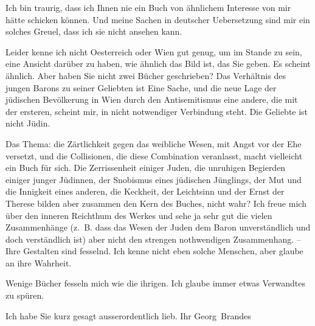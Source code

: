\pstart
           {\pb}Ich bin traurig, dass ich Ihnen
               nie ein Buch von ähnlichem Interesse von mir hätte schicken können. Und meine Sachen
               in deutscher Uebersetzung sind mir ein solches Greuel, dass ich sie nicht ansehen
               kann.\pend
           
\pstart
           Leider kenne ich nicht Oesterreich oder Wien gut genug, um im Stande zu sein, eine Ansicht
               darüber zu haben, wie ähnlich das Bild ist, das Sie geben. Es scheint ähnlich. Aber
               haben Sie nicht zwei Bücher geschrieben? Das Verhältnis des jungen Barons zu seiner Geliebten ist Eine Sache,
               und die {\pb}neue Lage der jüdischen
               Bevölkerung in Wien durch den Antisemitismus eine
               andere, die mit der ersteren, scheint mir, in nicht notwendiger Verbindung steht. Die
               Geliebte ist nicht Jüdin.\pend
           
\pstart
           Das Thema: die Zärtlichkeit gegen das weibliche Wesen, mit Angst vor der Ehe
               versetzt, und die Collisionen, die diese Combination veranlasst,  macht vielleicht ein Buch für sich. Die
               Zerrissenheit einiger Juden, die unruhigen Begierden einiger junger Jüdinnen, der
               Snobismus eines jüdischen Jünglings, der {\pb}Mut und die Innigkeit eines
               anderen, die Keckheit, der Leichtsinn und der Ernst der Therese bilden aber zusammen den Kern des
               Buches, nicht wahr? Ich freue mich über den inneren Reichthum des Werkes und sehe ja
               sehr gut die vielen Zusammenhänge (z. B. dass das Wesen der Juden dem Baron
               unverständlich und doch verständlich ist) aber nicht den strengen nothwendigen
               Zusammenhang. – Ihre Gestalten sind fesselnd. Ich kenne nicht eben solche Menschen,
               aber glaube an ihre Wahrheit.\pend
           
\pstart
           Wenige Bücher fesseln mich wie die ihrigen. Ich glaube immer etwas Verwandtes zu
               spüren.\pend
           
\pstart
           Ich habe Sie kurz gesagt ausserordentlich lieb.\pend
           \pstart Ihr \spacefill\mbox{Georg Brandes}\pend{}\endnumbering{}  \newcommand{\dateiname}{L01777}\newcommand{\titel}{Georg Brandes an Arthur Schnitzler, [25. 6. 1908]}\newcommand{\editorInnen}{Martin Anton Müller und Gerd-Hermann Susen}
